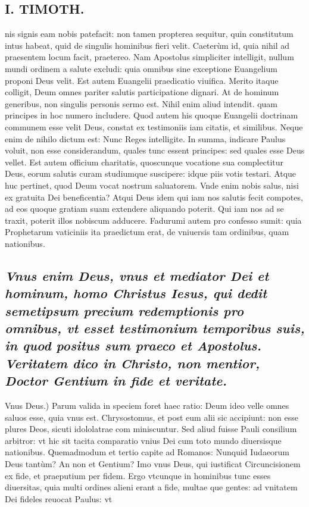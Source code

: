 \documentclass{article}
\begin{document}
\begin{pages}
\section*{I. TIMOTH. }
\marginpar{[ p.80 ]}\pstart nis signis eam nobis patefacit: non tamen propterea sequitur, quin constitutum intus habeat, quid de singulis hominibus fieri velit. Caeterùm id, quia nihil ad praesentem locum facit, praetereo. Nam Apostolus simpliciter intelligit, nullum mundi ordinem a salute excludi: quia omnibus sine exceptione Euangelium proponi Deus velit. Est autem Euangelii praedicatio viuifica. Merito itaque colligit, Deum omnes pariter salutis participatione dignari. At de hominum generibus, non singulis personis sermo est. Nihil enim aliud intendit. quam principes in hoc numero includere. Quod autem his quoque Euangelii doctrinam communem esse velit Deus, constat ex testimoniis iam citatis, et similibus. Neque enim de nihilo dictum est: Nunc Reges intelligite. In summa, indicare Paulus voluit, non esse considerandum, quales tunc essent principes: sed quales esse Deus vellet. Est autem officium charitatis, quoscunque vocatione sua complectitur Deus, eorum salutis curam studiumque suscipere: idque piis votis testari. Atque huc pertinet, quod Deum vocat nostrum saluatorem. Vnde enim nobis salus, nisi ex gratuita Dei beneficentia? Atqui Deus idem qui iam nos salutis fecit compotes, ad eos quoque gratiam suam extendere aliquando poterit. Qui iam nos ad se traxit, poterit illos nobiscum adducere. Fadurumi autem pro confesso sumit: quia Prophetarum vaticiniis ita praedictum erat, de vniuersis tam ordinibus, quam nationibus.  \pend
{}
{}
\subsection*{\textit{Vnus enim Deus, vnus et mediator Dei et hominum, homo Christus Iesus, qui dedit semetipsum precium redemptionis pro omnibus, vt esset testimonium temporibus suis, in quod positus sum praeco et Apostolus. Veritatem dico in Christo, non mentior, Doctor Gentium in fide et veritate. }}\pstart Vnus Deus.) Parum valida in speciem foret haec ratio: Deum ideo velle omnes saluos esse, quia vnus est. Chrysostomus, et post eum alii sic accipiunt: non esse plures Deos, sicuti idololatrae com miniscuntur. Sed aliud fuisse Pauli consilium arbitror: vt hic sit tacita comparatio vnius Dei cum toto mundo diuersisque nationibus. Quemadmodum et tertio capite ad Romanos: Nunquid Iudaeorum Deus tantùm? An non et Gentium? Imo vnus Deus, qui iustificat Circuncisionem ex fide, et praeputium per fidem. Ergo vtcunque in hominibus tunc esses diuersitas, quia multi ordines alieni erant a fide, multae que gentes: ad vnitatem Dei fideles reuocat Paulus: vt  \pend

\end{pages}
\end{document}
